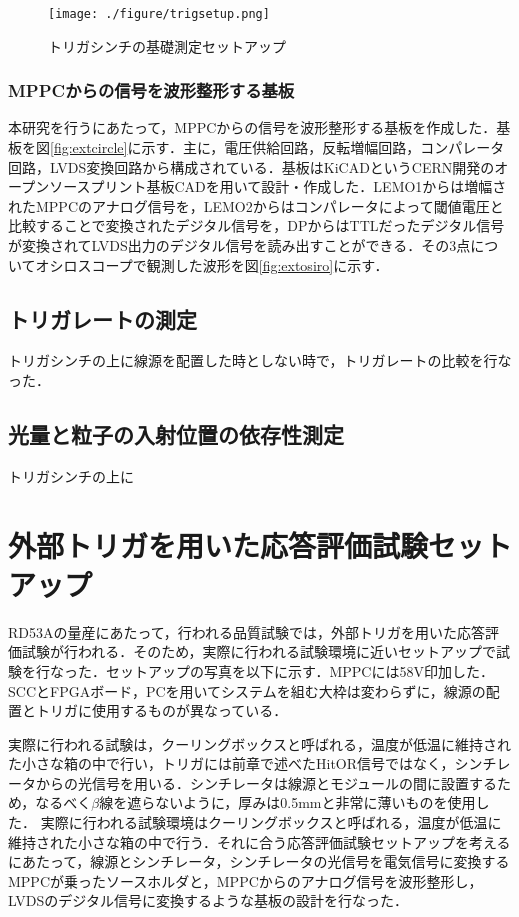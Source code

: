 \begin{figure}[h]
  \centering
  \texttt{[image: ./figure/trigsetup.png]}
  \caption{トリガシンチの基礎測定セットアップ}
  \label{fig:trigsetup}
\end{figure}

\subsubsection*{MPPCからの信号を波形整形する基板}
本研究を行うにあたって，MPPCからの信号を波形整形する基板を作成した．基板を図\ref{fig:extcircle}に示す．主に，電圧供給回路，反転増幅回路，コンパレータ回路，LVDS変換回路から構成されている．基板はKiCADというCERN開発のオープンソースプリント基板CADを用いて設計・作成した．LEMO1からは増幅されたMPPCのアナログ信号を，LEMO2からはコンパレータによって閾値電圧と比較することで変換されたデジタル信号を，DPからはTTLだったデジタル信号が変換されてLVDS出力のデジタル信号を読み出すことができる．その3点についてオシロスコープで観測した波形を図\ref{fig:extosiro}に示す．


\subsection{トリガレートの測定}
トリガシンチの上に線源を配置した時としない時で，トリガレートの比較を行なった．


\subsection{光量と粒子の入射位置の依存性測定}
トリガシンチの上に

\section{外部トリガを用いた応答評価試験セットアップ}
\label{sec:extsetup}
RD53Aの量産にあたって，行われる品質試験では，外部トリガを用いた応答評価試験が行われる．そのため，実際に行われる試験環境に近いセットアップで試験を行なった．セットアップの写真を以下に示す．MPPCには58$\mathrm{V}$印加した．SCCとFPGAボード，PCを用いてシステムを組む大枠は変わらずに，線源の配置とトリガに使用するものが異なっている．\par
実際に行われる試験は，クーリングボックスと呼ばれる，温度が低温に維持された小さな箱の中で行い，トリガには前章で述べたHitOR信号ではなく，シンチレータからの光信号を用いる．シンチレータは線源とモジュールの間に設置するため，なるべく$\beta$線を遮らないように，厚みは0.5$\mathrm{mm}$と非常に薄いものを使用した．
実際に行われる試験環境はクーリングボックスと呼ばれる，温度が低温に維持された小さな箱の中で行う．それに合う応答評価試験セットアップを考えるにあたって，線源とシンチレータ，シンチレータの光信号を電気信号に変換するMPPCが乗ったソースホルダと，MPPCからのアナログ信号を波形整形し，LVDSのデジタル信号に変換するような基板の設計を行なった．

